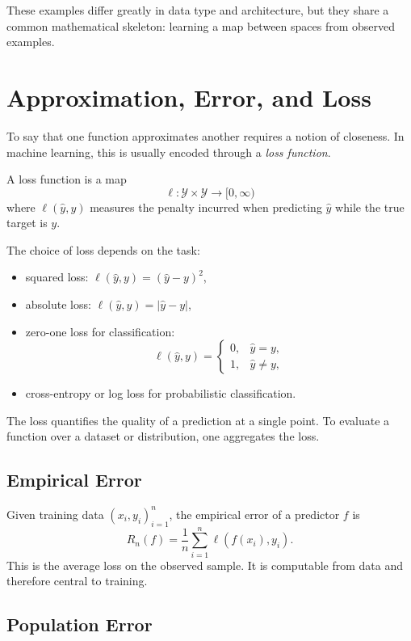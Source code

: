 These examples differ greatly in data type and architecture, but they share a common mathematical skeleton: learning a map between spaces from observed examples.

\section{Approximation, Error, and Loss}

To say that one function approximates another requires a notion of closeness. In machine learning, this is usually encoded through a \emph{loss function}.

\begin{definition}
A loss function is a map
\[
\ell : \mathcal{Y} \times \mathcal{Y} \to [0,\infty)
\]
where $\ell(\hat y, y)$ measures the penalty incurred when predicting $\hat y$ while the true target is $y$.
\end{definition}

The choice of loss depends on the task:
\begin{itemize}
    \item squared loss: $\ell(\hat y,y) = (\hat y-y)^2$,
    \item absolute loss: $\ell(\hat y,y) = |\hat y-y|$,
    \item zero-one loss for classification:
    \[
    \ell(\hat y,y)=
    \begin{cases}
        0, & \hat y = y,\\
        1, & \hat y \neq y,
    \end{cases}
    \]
    \item cross-entropy or log loss for probabilistic classification.
\end{itemize}

The loss quantifies the quality of a prediction at a single point. To evaluate a function over a dataset or distribution, one aggregates the loss.

\subsection{Empirical Error}

Given training data $(x_i,y_i)_{i=1}^n$, the empirical error of a predictor $f$ is
\[
\widehat{R}_n(f) = \frac{1}{n}\sum_{i=1}^n \ell(f(x_i),y_i).
\]
This is the average loss on the observed sample. It is computable from data and therefore central to training.

\subsection{Population Error}


